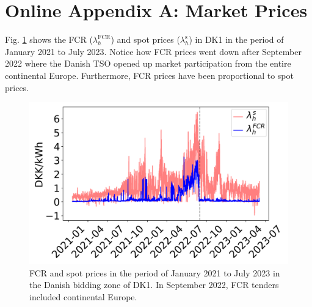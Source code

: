 \documentclass[conference]{IEEEtran}
\begin{document}

\vspace{-1mm}

%



\newpage

\section*{Online Appendix A: Market Prices}\label{app:market-prices}


Fig. \ref{fig:fcr_prices_2022} shows the FCR ($\lambda_{h}^{\text{FCR}}$) and spot prices ($\lambda_{h}^{\text{s}}$) in DK1 in the period of January 2021 to July 2023. Notice how FCR prices went down after September 2022 where the Danish TSO opened up market participation from the entire continental Europe. Furthermore, FCR prices have been proportional to spot prices.

\begin{figure}[t]
    \centering
    \includegraphics[width=\columnwidth]{../figures/fcr_prices.png}
    \caption{\small{FCR and spot prices in the period of January 2021 to July 2023 in the Danish bidding zone of DK1. In September 2022, FCR tenders included continental Europe.}}
    \label{fig:fcr_prices_2022}
\end{figure}
\end{document}

